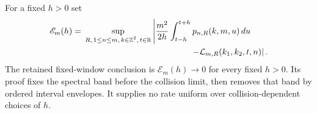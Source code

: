 For a fixed $h>0$ set
\begin{equation}\label{eq:ui-inherited-window-error}
 \begin{aligned}
 \mathscr E_m(h)={}&
 \sup_{\substack{R,\,1\le n\le m,\,k\in\mathbb Z^2,\,t\in\mathbb R}}
 \left|\frac{m^2}{2h}\int_{t-h}^{t+h}p_{n,R}(k,m,u)\,du\right.\\
 &\hspace{44mm}\left.
               -\mathcal L_{m,R}(k_1,k_2,t,n)\right|.
 \end{aligned}
\end{equation}
The retained fixed-window conclusion is
$\mathscr E_m(h)\to0$ for every fixed $h>0$. Its proof fixes
the spectral band before the collision limit, then removes that
band by ordered interval envelopes. It supplies no rate uniform
over collision-dependent choices of $h$.

